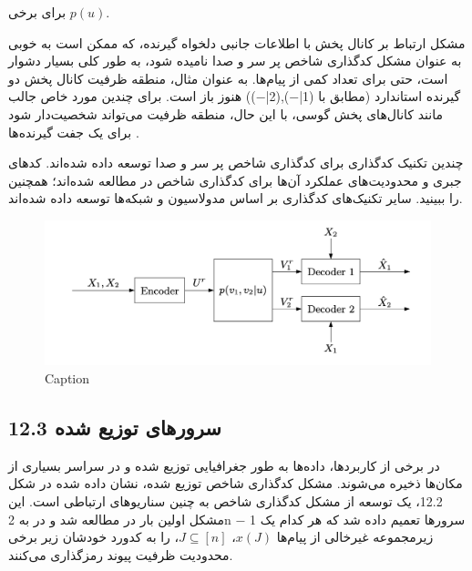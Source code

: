 برای برخی \(p(u)\).

مشکل ارتباط بر کانال پخش با اطلاعات جانبی دلخواه گیرنده، که ممکن است به خوبی به عنوان مشکل کدگذاری شاخص پر سر و صدا نامیده شود، به طور کلی بسیار دشوار است، حتی برای تعداد کمی از پیام‌ها. به عنوان مثال، منطقه ظرفیت کانال پخش دو گیرنده استاندارد \lr{[48]} (مطابق با (1|−),(2|−)) هنوز باز است. برای چندین مورد خاص جالب مانند کانال‌های پخش گوسی، با این حال، منطقه ظرفیت می‌تواند شخصیت‌دار شود برای یک جفت گیرنده‌ها \lr{[163, 137, 16]}.

چندین تکنیک کدگذاری برای کدگذاری شاخص پر سر و صدا توسعه داده شده‌اند. کدهای جبری و محدودیت‌های عملکرد آن‌ها برای کدگذاری شاخص در \lr{[52]} مطالعه شده‌اند؛ همچنین \lr{[32]} را ببینید. سایر تکنیک‌های کدگذاری بر اساس مدولاسیون \lr{[112]} و شبکه‌ها \lr{[113, 79]} توسعه داده شده‌اند.
\begin{figure}
	\centering
	\includegraphics{figs/chapter8/12.1.png}
	\caption{Caption}
	\label{fig:my_label}
\end{figure}
\subsection{12.3 سرورهای توزیع شده}

در برخی از کاربردها، داده‌ها به طور جغرافیایی توزیع شده و در سراسر بسیاری از مکان‌ها ذخیره می‌شوند. مشکل کدگذاری شاخص توزیع شده، نشان داده شده در شکل 12.2، یک توسعه از مشکل کدگذاری شاخص به چنین سناریوهای ارتباطی است. این مشکل اولین بار در \lr{[116]} مطالعه شد و در \lr{[124]} به 2n − 1 سرورها تعمیم داده شد که هر کدام یک زیرمجموعه غیرخالی از پیام‌ها \(x(J)\)، \(J \subseteq [n]\)، را به کدورد خودشان زیر برخی محدودیت ظرفیت پیوند رمزگذاری می‌کنند.



